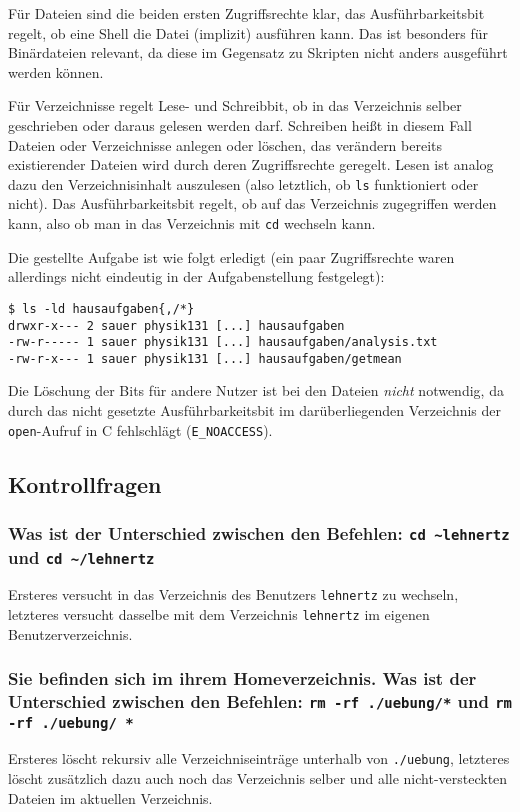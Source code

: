 Für Dateien sind die beiden ersten Zugriffsrechte klar, das Ausführbarkeitsbit
regelt, ob eine Shell die Datei (implizit) ausführen kann. Das ist besonders für
Binärdateien relevant, da diese im Gegensatz zu Skripten nicht anders ausgeführt
werden können.

Für Verzeichnisse regelt Lese- und Schreibbit, ob in das Verzeichnis selber
geschrieben oder daraus gelesen werden darf. Schreiben heißt in diesem Fall
Dateien oder Verzeichnisse anlegen oder löschen, das verändern bereits
existierender Dateien wird durch deren Zugriffsrechte geregelt. Lesen ist analog
dazu den Verzeichnisinhalt auszulesen (also letztlich, ob \lstinline'ls'
funktioniert oder nicht). Das Ausführbarkeitsbit regelt, ob auf das Verzeichnis
zugegriffen werden kann, also ob man in das Verzeichnis mit \lstinline'cd'
wechseln kann.

Die gestellte Aufgabe ist wie folgt erledigt (ein paar Zugriffsrechte waren
allerdings nicht eindeutig in der Aufgabenstellung festgelegt):
\begin{lstlisting}
$ ls -ld hausaufgaben{,/*}
drwxr-x--- 2 sauer physik131 [...] hausaufgaben
-rw-r----- 1 sauer physik131 [...] hausaufgaben/analysis.txt
-rw-r-x--- 1 sauer physik131 [...] hausaufgaben/getmean
\end{lstlisting}
Die Löschung der Bits für andere Nutzer ist bei den Dateien \emph{nicht}
notwendig, da durch das nicht gesetzte Ausführbarkeitsbit im darüberliegenden
Verzeichnis der \lstinline'open'-Aufruf in C fehlschlägt
(\lstinline'E_NOACCESS').

\subsection{Kontrollfragen}

\subsubsection*{Was ist der Unterschied zwischen den Befehlen: \lstinline'cd
~lehnertz' und \lstinline'cd ~/lehnertz'}
Ersteres versucht in das Verzeichnis des Benutzers \verb'lehnertz' zu wechseln,
letzteres versucht dasselbe mit dem Verzeichnis \verb'lehnertz' im eigenen
Benutzerverzeichnis.

\subsubsection*{Sie befinden sich im ihrem Homeverzeichnis. Was ist der
Unterschied zwischen den Befehlen: \lstinline'rm -rf ./uebung/*' und
\lstinline'rm -rf ./uebung/ *'}
Ersteres löscht rekursiv alle Verzeichniseinträge unterhalb von \verb'./uebung',
letzteres löscht zusätzlich dazu auch noch das Verzeichnis selber und alle
nicht-versteckten Dateien im aktuellen Verzeichnis.

